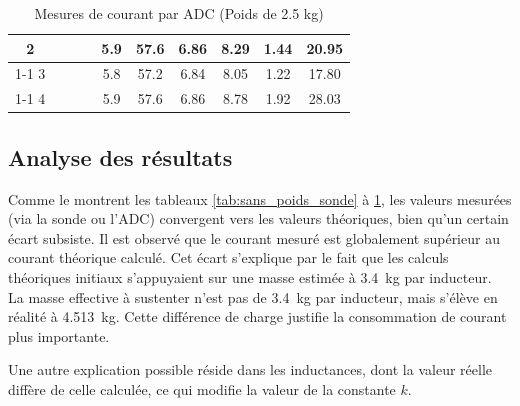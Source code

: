 \begin{table}[H]
{\begin{tabular}{|c|c|c|c|c|c|c|c|c|c|}
            2         &                                                            &                           &                                                                                        & 5.9                                                      & 57.6                                                    & 6.86                                                                & 8.29                                                  & 1.44   & 20.95                                                              \\ \cline{1-1} \cline{5-10}
            3         &                                                            &                           &                                                                                        & 5.8                                                      & 57.2                                                    & 6.84                                                                & 8.05                                                  & 1.22   & 17.80                                                              \\ \cline{1-1} \cline{5-10}
            4         &                                                            &                           &                                                                                        & 5.9                                                      & 57.6                                                    & 6.86                                                                & 8.78                                                  & 1.92   & 28.03                                                              \\ \hline
        \end{tabular}%
    }
    \caption{Mesures de courant par ADC (Poids de 2.5 kg)}
    \label{tab:poids_2_5_adc}
\end{table}

\subsection{Analyse des résultats}
Comme le montrent les tableaux \ref{tab:sans_poids_sonde} à \ref{tab:poids_2_5_adc}, les valeurs mesurées (via la sonde ou l'ADC) convergent vers les valeurs théoriques, bien qu'un certain écart subsiste. Il est observé que le courant mesuré est globalement supérieur au courant théorique calculé. Cet écart s'explique par le fait que les calculs théoriques initiaux s'appuyaient sur une masse estimée à 3.4~kg par inducteur. La masse effective à sustenter n'est pas de 3.4~kg par inducteur, mais s'élève en réalité à 4.513~kg. Cette différence de charge justifie la consommation de courant plus importante.

Une autre explication possible réside dans les inductances, dont la valeur réelle diffère de celle calculée, ce qui modifie la valeur de la constante $k$.